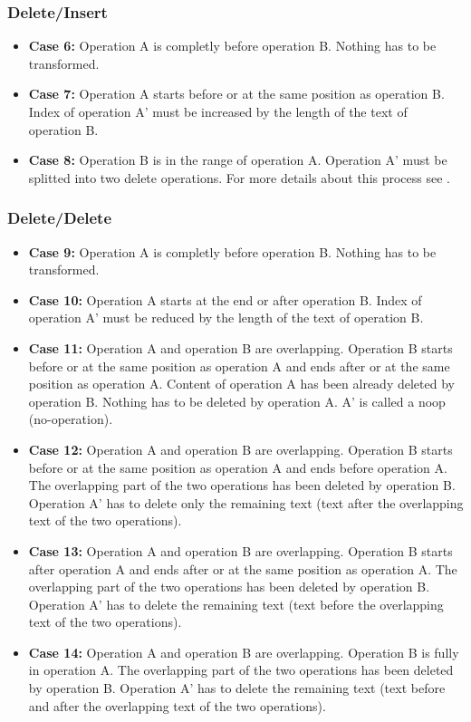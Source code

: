 \subsubsection{Delete/Insert}
\begin{itemize}
\item \textbf{Case 6:}
Operation A is completly before operation B. Nothing has to be transformed.
\item \textbf{Case 7:}
Operation A starts before or at the same position as operation B. Index of operation A' must be increased by the length of the text of operation B.
\item \textbf{Case 8:}
Operation B is in the range of operation A. Operation A' must be splitted into two delete operations. For more details about this process see \cite{Split_Operation}.
\end{itemize}

\subsubsection{Delete/Delete}
\begin{itemize}
\item \textbf{Case 9:}
Operation A is completly before operation B. Nothing has to be transformed.
\item \textbf{Case 10:}
Operation A starts at the end or after operation B. Index of operation A' must be reduced by the length of the text of operation B.
\item \textbf{Case 11:}
Operation A and operation B are overlapping. Operation B starts before or at the same position as operation A and ends after or at the same position as operation A. Content of operation A has been already deleted by operation B. Nothing has to be deleted by operation A. A' is called a noop (no-operation).
\item \textbf{Case 12:}
Operation A and operation B are overlapping. Operation B starts before or at the same position as operation A and ends before operation A. The overlapping part of the two operations has been deleted by operation B. Operation A' has to delete only the remaining text (text after the overlapping text of the two operations).
\item \textbf{Case 13:}
Operation A and operation B are overlapping. Operation B starts after operation A and ends after or at the same position as operation A. The overlapping part of the two operations has been deleted by operation B. Operation A' has to delete the remaining text (text before the overlapping text of the two operations).
\item \textbf{Case 14:}
Operation A and operation B are overlapping. Operation B is fully in operation A. The overlapping part of the two operations has been deleted by operation B. Operation A' has to delete the remaining text (text before and after the overlapping text of the two operations).
\end{itemize}



